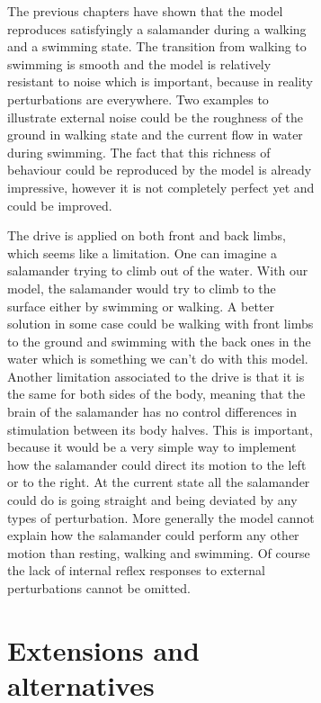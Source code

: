 \documentclass[a4paper]{scrartcl}
\begin{document}
\begin{figure}[!b]
\begin{figure}[!b]
The previous chapters have shown that the model reproduces satisfyingly a salamander during a walking and a swimming state. The transition from walking to swimming is smooth and the model is relatively resistant to noise which is important, because in reality perturbations are everywhere. Two examples to illustrate external noise could be the roughness of the ground in walking state and the current flow in water during swimming. The fact that this richness of behaviour could be reproduced by the model is already impressive, however it is not completely perfect yet and could be improved.

The drive is applied on both front and back limbs, which seems like a limitation. One can imagine a salamander trying to climb out of the water. With our model, the salamander would try to climb to the surface either by swimming or walking. A better solution in some case could be walking with front limbs to the ground and swimming with the back ones in the water which is something we can't do with this model. Another limitation associated to the drive is that it is the same for both sides of the body, meaning that the brain of the salamander has no control differences in stimulation between its body halves. This is important, because it would be a very simple way to implement how the salamander could direct its motion to the left or to the right. At the current state all the salamander could do is going straight and being deviated by any types of perturbation. More generally the model cannot explain how the salamander could perform any other motion than resting, walking and swimming. Of course the lack of internal reflex responses to external perturbations cannot be omitted.

\newpage
\section{Extensions and alternatives}


\end{figure}
\end{figure}
\end{document}
